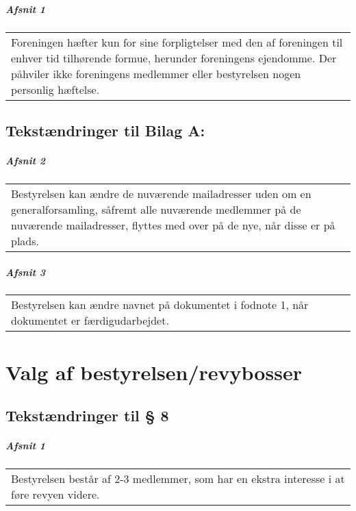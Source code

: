 \documentclass[a4paper,11pt]{report}
\newenvironment{quotationb}%
{\begin{tabular}{|p{10cm}}}%
{\\\end{tabular}}
\begin{document}
\begin{appendices}
\paragraph{Afsnit 1}

\begin{quotationb}
Foreningen hæfter kun for sine forpligtelser med den af foreningen til enhver
tid tilhørende formue, herunder foreningens ejendomme.  Der påhviler ikke
foreningens medlemmer eller bestyrelsen nogen personlig hæftelse.
\end{quotationb}

\section*{Tekstændringer til Bilag A:}

\paragraph{Afsnit 2}

\begin{quotationb}
Bestyrelsen kan ændre de nuværende mailadresser uden om en generalforsamling,
såfremt alle nuværende medlemmer på de nuværende mailadresser, flyttes med
over på de nye, når disse er på plads.
\end{quotationb}

\paragraph{Afsnit 3}

\begin{quotationb}
Bestyrelsen kan ændre navnet på dokumentet i fodnote 1, når dokumentet er
færdigudarbejdet.
\end{quotationb}

\chapter{Valg af bestyrelsen/revybosser}
\label{app:change3}

\section*{Tekstændringer til § 8}

\paragraph{Afsnit 1}

\begin{quotationb}
Bestyrelsen består af 2-3 medlemmer, som har en ekstra interesse i at føre
revyen videre.
\end{quotationb}


\end{appendices}
\end{document}

